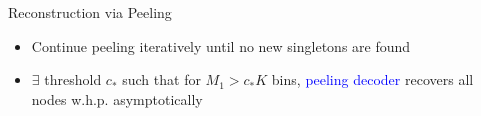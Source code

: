 \documentclass[final]{beamer}
\newlength{\twocolwid}
\newlength{\paraskip}
\begin{document}
\begin{frame}
\begin{columns}[t]
\begin{column}{\twocolwid}
\begin{block}{\Large Reconstruction via Peeling}
       \begin{figure}
	       \centering
	       \begin{subfigure}{.5\textwidth}
			  \centering
   			\scalebox{1.1}{}
		   \end{subfigure}%
		  \begin{subfigure}{.5	\textwidth}
		  \centering
		  \scalebox{1.1}{}
			\end{subfigure}	
		\end{figure}
\vspace{\paraskip}	 
	 \begin{itemize}
	   \item Continue peeling iteratively until no new singletons are found
	   \item $\exists$ threshold $c_*$ such that for $M_1>c_*K$ bins, \textcolor{blue}{peeling decoder} recovers all nodes w.h.p. asymptotically
    \end{itemize}
    \end{block}  
 \end{column}


\end{columns}
\end{frame}
\end{document}
